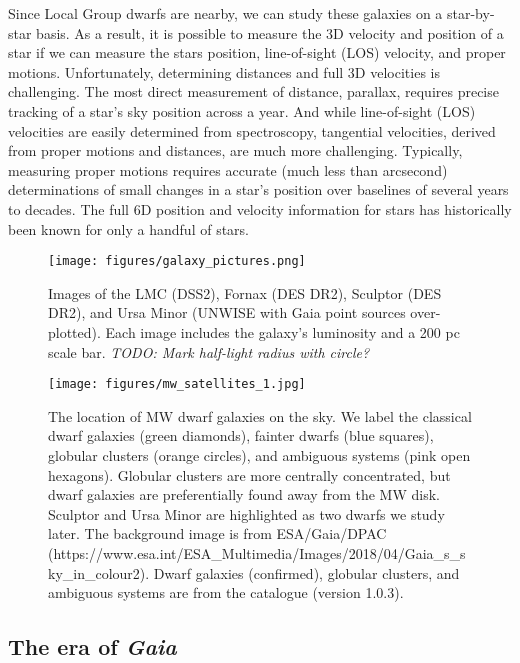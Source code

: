 Since Local Group dwarfs are nearby, we can study these galaxies on a
star-by-star basis. As a result, it is possible to measure the 3D
velocity and position of a star if we can measure the stars position,
line-of-sight (LOS) velocity, and proper motions. Unfortunately,
determining distances and full 3D velocities is challenging. The most
direct measurement of distance, parallax, requires precise tracking of a
star's sky position across a year. And while line-of-sight (LOS)
velocities are easily determined from spectroscopy, tangential
velocities, derived from proper motions and distances, are much more
challenging. Typically, measuring proper motions requires accurate (much
less than arcsecond) determinations of small changes in a star's
position over baselines of several years to decades. The full 6D
position and velocity information for stars has historically been known
for only a handful of stars.

\begin{figure}
\centering
\texttt{[image: figures/galaxy\_pictures.png]}
\caption[Dwarf Galaxy Pictures]{Images of the LMC (DSS2), Fornax (DES
DR2), Sculptor (DES DR2), and Ursa Minor (UNWISE with Gaia point sources
over-plotted). Each image includes the galaxy's luminosity and a 200 pc
scale bar. \emph{TODO: Mark half-light radius with
circle?}}\label{fig:galaxy_images}
\end{figure}

\begin{figure}
\centering
\texttt{[image: figures/mw\_satellites\_1.jpg]}
\caption[Dwarf galaxies sky position]{The location of MW dwarf galaxies
on the sky. We label the classical dwarf galaxies (green diamonds),
fainter dwarfs (blue squares), globular clusters (orange circles), and
ambiguous systems (pink open hexagons). Globular clusters are more
centrally concentrated, but dwarf galaxies are preferentially found away
from the MW disk. Sculptor and Ursa Minor are highlighted as two dwarfs
we study later. The background image is from ESA/Gaia/DPAC
(https://www.esa.int/ESA\_Multimedia/Images/2018/04/Gaia\_s\_sky\_in\_colour2).
Dwarf galaxies (confirmed), globular clusters, and ambiguous systems are
from the \citet{pace2024} catalogue (version
1.0.3).}\label{fig:mw_satellite_system}
\end{figure}

\subsection{\texorpdfstring{The era of
\emph{Gaia}}{The era of Gaia}}\label{the-era-of-gaia}

